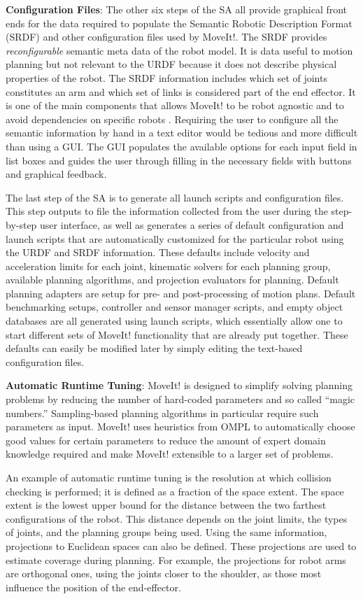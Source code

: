 \documentclass[10pt,journal,compsoc]{joser1}
\begin{document}
{{\bf Configuration Files}: The other six steps of the SA all provide graphical front ends for the data required to populate the Semantic Robotic Description Format (SRDF) and other configuration files used by MoveIt!. The SRDF provides \textit{reconfigurable} semantic meta data of the robot model. It is data useful to motion planning but not relevant to the URDF because it does not describe physical properties of the robot. The SRDF information includes which set of joints constitutes an arm and which set of links is considered part of the end effector. It is one of the main components that allows MoveIt! to be robot agnostic and to avoid dependencies on specific robots \cite{moveit}. Requiring the user to configure all the semantic information by hand in a text editor would be tedious and more difficult than using a GUI. The GUI populates the available options for each input field in list boxes and guides the user through filling in the necessary fields with buttons and graphical feedback.

The last step of the SA is to generate all launch scripts and configuration files. This step outputs to file the information collected from the user during the step-by-step user interface, as well as generates a series of default configuration and launch scripts that are automatically customized for the particular robot using the URDF and SRDF information. These defaults include velocity and acceleration limits for each joint, kinematic solvers for each planning group, available planning algorithms, and projection evaluators for planning. Default planning adapters are setup for pre- and post-processing of motion plans. Default benchmarking setups, controller and sensor manager scripts, and empty object databases are all generated using launch scripts, which essentially allow one to start different sets of MoveIt! functionality that are already put together. These defaults can easily be modified later by simply editing the text-based configuration files.

{\bf Automatic Runtime Tuning}: MoveIt! is designed to simplify solving planning problems by reducing the number of hard-coded parameters and so called ``magic numbers.'' Sampling-based planning algorithms in particular require such parameters as input. MoveIt! uses heuristics from OMPL to automatically choose good values for certain parameters to reduce the amount of expert domain knowledge required and make MoveIt! extensible to a larger set of problems. 

An example of automatic runtime tuning is the resolution at which collision checking is performed; it is defined as a fraction of the space extent. The space extent is the lowest upper bound for the distance between the two farthest configurations of the robot. This distance depends on the joint limits, the types of joints, and the planning groups being used. Using the same information, projections to Euclidean spaces can also be defined. These projections are used to estimate coverage during planning. For example, the projections for robot arms are orthogonal ones, using the joints closer to the shoulder, as those most influence the position of the end-effector.

}
\end{document}
